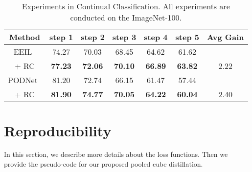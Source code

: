 \documentclass[10pt,twocolumn,letterpaper]{article}
\begin{document}
\begin{table}[!h]
    \centering
    \small
    \setlength{\tabcolsep}{2.5pt} \begin{tabular}{c||c|c|c|c|c||c}
    \hline
        Method & step 1 & step 2 & step 3 & step 4 & step 5 & Avg Gain\\\hline 
        EEIL~\cite{wu2019large}  & 74.27 & 70.03 & 68.45 & 64.62 & 61.62 & \\
        + RC & \bf{77.23} & \bf{72.06} & \bf{70.10} & \bf{66.89} & \bf{63.82} & 2.22 \textcolor{red}{} \\\hline 
        PODNet~\cite{douillard2020podnet} & 81.20 & 72.74 & 66.15 & 61.47 & 57.44 & \\
        + RC & \bf{81.90} & \bf{74.77} & \bf{70.05} & \bf{64.22} & \bf{60.04} & 2.40 \textcolor{red}{}\\
\hline
    \end{tabular}
    \caption{Experiments in Continual Classification. All experiments are conducted on the ImageNet-100.}
    \label{tab:classification}
\end{table}



\section{Reproducibility}\label{sec:reproducibility} \label{sec:reproduce}
In this section,
we describe more details about the loss functions.
Then we provide the pseudo-code for our proposed pooled cube distillation.
\end{document}
